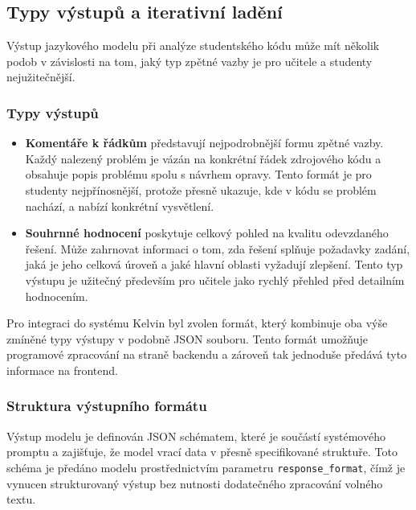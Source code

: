 \subsection{Typy výstupů a iterativní ladění}
\label{subsec:prompts-output}

Výstup jazykového modelu při analýze studentského kódu může mít několik podob v závislosti na tom, jaký typ zpětné vazby je pro učitele a studenty nejužitečnější.

\subsubsection*{Typy výstupů}
\label{subsubsec:prompts-output-types}

\begin{itemize}
    \item \textbf{Komentáře k řádkům} představují nejpodrobnější formu zpětné vazby.
    Každý nalezený problém je vázán na konkrétní řádek zdrojového kódu a obsahuje popis problému spolu s návrhem opravy.
    Tento formát je pro studenty nejpřínosnější, protože přesně ukazuje, kde v kódu se problém nachází, a nabízí konkrétní vysvětlení.

    \item \textbf{Souhrnné hodnocení} poskytuje celkový pohled na kvalitu odevzdaného řešení.
    Může zahrnovat informaci o tom, zda řešení splňuje požadavky zadání, jaká je jeho celková úroveň a jaké hlavní oblasti vyžadují zlepšení.
    Tento typ výstupu je užitečný především pro učitele jako rychlý přehled před detailním hodnocením.
\end{itemize}

Pro integraci do systému Kelvin byl zvolen formát, který kombinuje oba výše zmíněné typy výstupy v podobně JSON souboru.
Tento formát umožňuje programové zpracování na straně backendu a zároveň tak jednoduše předává tyto informace na frontend.

\subsubsection*{Struktura výstupního formátu}
\label{subsubsec:prompts-output-structure}

Výstup modelu je definován JSON schématem, které je součástí systémového promptu a zajišťuje, že model vrací data v přesně specifikované struktuře.
Toto schéma je předáno modelu prostřednictvím parametru \texttt{response\_format}, čímž je vynucen strukturovaný výstup bez nutnosti dodatečného zpracování volného textu.

